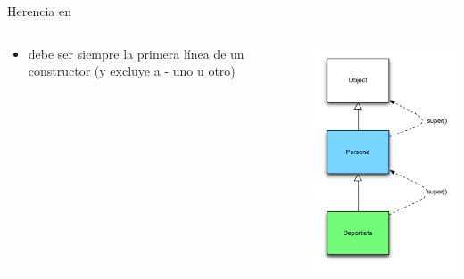 \documentclass[10pt,envcountsect,spanish]{beamer}
\begin{document}
\begin{frame}{Herencia en }
\begin{columns}
\begin{column}{.65\textwidth}
\begin{itemize}
\item {} debe ser siempre la primera línea de un constructor (y excluye a   - uno u otro)
\end{itemize}

\end{column}
\begin{column}{.2\textwidth}
\vskip 0.1cm
\centerline{\includegraphics[width=1.5\textwidth, height=0.3\textheight]{fig/super}}
\end{column}
\end{columns}

\end{frame}
\end{document}
